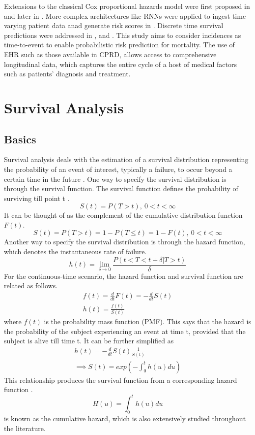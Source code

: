 \documentclass[%
 reprint,
 amsmath,amssymb,
 aps,nofootinbib
]{revtex4-2}
\begin{document}
Extensions to the classical Cox proportional hazards model were first proposed in \cite{faraggi_simons} and later in \cite{deepsurv}. More complex architectures like RNNs were applied to ingest time-varying patient data anad generate risk scores in \cite{rnn_surv}. Discrete time survival predictions were addressed in \cite{kvamme_tte}, \cite{nagpal_deep_2021} and \cite{deephit}. This study aims to consider incidences as time-to-event to enable  probabilistic risk prediction for mortality. The use of EHR such as those available in CPRD, allows access to comprehensive longitudinal data, which captures the entire cycle of a host of medical factors such as patients' diagnosis and treatment.

\section{\label{surv}Survival Analysis}
\subsection{\label{surv_basics}Basics}
Survival analysis deals with the estimation of a survival distribution representing the probability of an event of interest, typically a failure, to occur beyond a certain time in the future \cite{nagpal_deep_2021}. One way to specify the survival distribution is through the survival function. The survival function defines the probability of surviving till point t \cite{Moore_2016}.
\[
S(t) = P(T>t), \ 0 < t <  \infty
\]
It can be thought of as the complement of the cumulative distribution function $F(t)$.
\[
S(t) = P(T>t) = 1 - P(T\le t) = 1 - F(t), \ 0 < t <  \infty
\]
Another way to specify the survival distribution is through the hazard function, which denotes the instantaneous rate of failure.
\[
h(t) = \lim_{\delta\to0}\frac{P(t<T<t+\delta|T>t)}{\delta}
\]
For the continuous-time scenario, the hazard function and survival function are related as follows. 
\begin{gather*}
f(t) = \frac{d}{dt}F(t) = -\frac{d}{dt}S(t)\\
h(t) = \frac{f(t)}{S(t)} 
\end{gather*}
where $f(t)$ is the probability mass function (PMF). This says that the hazard is the probability of the subject experiencing an event at time t, provided that the subject is alive till time t. It can be further simplified as
\begin{gather*}
h(t) = -\frac{d}{dt}S(t)\frac{1}{S(t)}\\
\implies S(t) = exp\left (- \int_{0}^{t}h(u)du\right)
\end{gather*}
This relationship produces the survival function from a corresponding hazard function \cite{Moore_2016}.
\[
H(u) = \int_{0}^{t}h(u)du
\]
is known as the cumulative hazard, which is also extensively studied throughout the literature.\\
\end{document}
